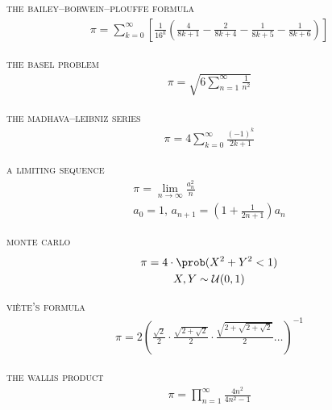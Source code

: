 \documentclass{article}
\begin{document}
\newcommand{\gap}{\vspace{2em}}
\newcommand{\name}[1]{\textsc{\lowercase{#1}}\vspace{0.5em}}

\centering

\name{The Bailey--Borwein--Plouffe formula}
\begin{gather*}
    \pi = \sum_{k=0}^\infty
    \left[
        \frac{1}{16^k}
        \left(
        \frac{4}{8k+1} -
        \frac{2}{8k+4} -
        \frac{1}{8k+5} -
        \frac{1}{8k+6}
        \right)
        \right]
\end{gather*}

\gap

\name{The Basel problem}
\begin{gather*}
    \pi = \sqrt{6 \sum_{n=1}^\infty \frac{1}{n^2}}
\end{gather*}

\gap

\name{The Madhava--Leibniz series}
\begin{gather*}
    \pi = 4 \sum_{k=0}^\infty \frac{(-1)^k}{2k + 1}
\end{gather*}

\gap

\name{A limiting sequence}
\begin{gather*}
    \pi     = \lim_{n \to \infty}\frac{a^2_n}{n}      \\
    a_0     = 1\text{, }
    a_{n+1} = \left( 1 + \frac{1}{2n + 1} \right) a_n
\end{gather*}

\gap

\name{Monte Carlo}
\begin{gather*}
    \pi = 4 \cdot \prob( X^2 + Y^2 < 1) \\
    X,Y \sim \mathcal{U}(0,1)
\end{gather*}

\gap

\name{Vi\`ete's formula}
\begin{gather*}
    \pi = 2 \left(
    \frac{\sqrt{2}}{2} \cdot
    \frac{\sqrt{2 + \sqrt{2}}}{2} \cdot
    \frac{\sqrt{2 + \sqrt{2 + \sqrt{2}}}}{2} \ldots
    \right)^{-1}
\end{gather*}

\gap
\name{The Wallis product}
\begin{gather*}
    \pi = \prod_{n=1}^\infty \frac{4n^2}{4n^2 - 1}
\end{gather*}
\end{document}
